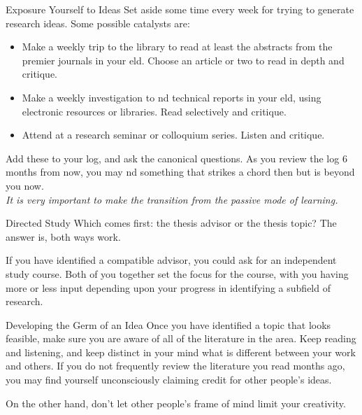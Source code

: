 \begin{frame}{Exposure Yourself to Ideas}
  Set aside some time every week for trying to generate research ideas. Some
  possible catalysts are:

  \begin{itemize}
    \item Make a weekly trip to the library to read at least the abstracts from the
      premier journals in your eld. Choose an article or two to read in depth
      and critique.

    \item Make a weekly investigation to nd technical reports in your eld, using
      electronic resources or libraries. Read selectively and critique.
    
    \item Attend at a research seminar or colloquium series. Listen and critique.
  \end{itemize}

  Add these to your log, and ask the canonical questions. As you review the
  log 6 months from now, you may nd something that strikes a chord then but
  is beyond you now.\\

  \textit{It is very important to make the transition from the passive mode of learning.}
\end{frame}

\begin{frame}{Directed Study}
  Which comes first: the thesis advisor or the thesis topic? The answer is, both
  ways work.\\\vspace{2em}

  If you have identified a compatible advisor, you could ask for an
  independent study course. Both of you together set the focus for the course,
  with you having more or less input depending upon your progress in identifying
  a subfield of research.
\end{frame}

\begin{frame}{Developing the Germ of an Idea}
  Once you have identified a topic that looks feasible, make sure you are aware of
  all of the literature in the area. Keep reading and listening, and keep distinct
  in your mind what is different between your work and others. If you do not
  frequently review the literature you read months ago, you may find yourself
  unconsciously claiming credit for other people's ideas.\\\vspace{2em}%

  On the other hand, don't let other people's frame of mind limit your creativity.
\end{frame}
